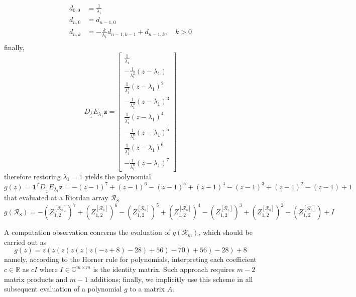 \begin{displaymath}
\begin{split}
d_{0,0}&=\frac{1}{\lambda_{1}}\\
d_{n,0}&=d_{n-1, 0}                                    \\
d_{n,k}&=-\frac{k}{\lambda_{1}}d_{n-1, k-1} + d_{n-1,k}, \quad k > 0\\
\end{split}
\end{displaymath}
finally,
\begin{displaymath}
D_{\frac{1}{z}}E_{\lambda_{1}}\boldsymbol{z} = \left[\begin{matrix}\frac{1}{\lambda_{1}}\\- \frac{1}{\lambda_{1}^{2}} \left(z - \lambda_{1}\right)\\\frac{1}{\lambda_{1}^{3}} \left(z - \lambda_{1}\right)^{2}\\- \frac{1}{\lambda_{1}^{4}} \left(z - \lambda_{1}\right)^{3}\\\frac{1}{\lambda_{1}^{5}} \left(z - \lambda_{1}\right)^{4}\\- \frac{1}{\lambda_{1}^{6}} \left(z - \lambda_{1}\right)^{5}\\\frac{1}{\lambda_{1}^{7}} \left(z - \lambda_{1}\right)^{6}\\- \frac{1}{\lambda_{1}^{8}} \left(z - \lambda_{1}\right)^{7}\end{matrix}\right]
\end{displaymath}
therefore restoring $\lambda_{1}=1$ yields the polynomial
\[g{\left (z \right )} = \boldsymbol{1}^{T}D_{\frac{1}{z}}E_{\lambda_{1}}\boldsymbol{z} = - \left(z - 1\right)^{7} + \left(z - 1\right)^{6} - \left(z - 1\right)^{5} + \left(z - 1\right)^{4} - \left(z - 1\right)^{3} + \left(z - 1\right)^{2} - (z-1) + 1\]
that evaluated at a Riordan array $\mathcal{R}_{8}$
\[g{\left (\mathcal{R}_{8} \right )} =  - \left(Z_{1,2}^{[\mathcal{R}_{8}]}\right)^{7} + \left(Z_{1,2}^{[\mathcal{R}_{8}]}\right)^{6} - \left(Z_{1,2}^{[\mathcal{R}_{8}]}\right)^{5} + \left(Z_{1,2}^{[\mathcal{R}_{8}]}\right)^{4} - \left(Z_{1,2}^{[\mathcal{R}_{8}]}\right)^{3} + \left(Z_{1,2}^{[\mathcal{R}_{8}]}\right)^{2} - \left(Z_{1,2}^{[\mathcal{R}_{8}]}\right) + I\]

A computation observation concerns the evaluation of $g(\mathcal{R}_{m})$, which should be carried out as
\begin{displaymath}
g(z) = z \left(z \left(z \left(z \left(z \left(z \left(- z + 8\right) - 28\right) + 56\right) - 70\right) + 56\right) - 28\right) + 8
\end{displaymath}
namely, according to the Horner rule for polynomials, interpreting each coefficient $c\in\mathbb{R}$ as $cI$ where $I\in\mathbb{C}^{m\times m}$ is the
identity matrix. Such approach requires $m-2$ matrix products and $m-1$ additions; finally, we implicitly use this scheme in all subsequent evaluation of a polynomial $g$ to a matrix $A$.



